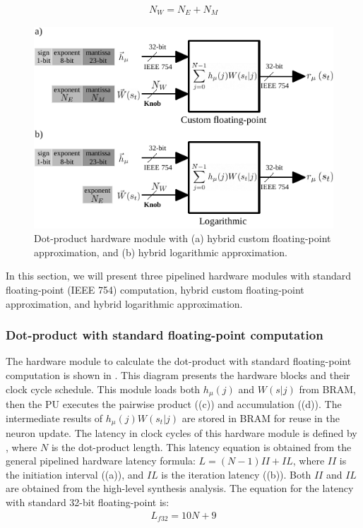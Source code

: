 \begin{eqnarray} \label{eq:bits_bitwidth}
N_W=N_E + N_M
\end{eqnarray}

\begin{figure}
\includegraphics[width=\columnwidth]{../figures/dot-product_unit_bitwidth.pdf}
\caption{Dot-product hardware module with (a) hybrid custom floating-point approximation, and (b) hybrid logarithmic approximation.}
\label{fig:product_unit_bitwidth}
\end{figure}

In this section, we will present three pipelined hardware modules with standard floating-point (IEEE 754) computation, hybrid custom floating-point approximation, and hybrid logarithmic approximation.

\subsubsection{Dot-product with standard floating-point computation}
 The hardware module to calculate the dot-product with standard floating-point computation is shown in . This diagram presents the hardware blocks and their clock cycle schedule. This module loads both $h_\mu(j)$ and $W(s|j)$ from BRAM, then the PU executes the pairwise product ((c)) and accumulation ((d)). The intermediate results of $h_\mu(j) W(s_t|j)$ are stored in BRAM for reuse in the neuron update. The latency in clock cycles of this hardware module is defined by , where $N$ is the dot-product length. This latency equation is obtained from the general pipelined hardware latency formula: $L=\left(N-1\right)II+IL$, where $II$ is the initiation interval ((a)), and $IL$ is the iteration latency ((b)). Both $II$ and $IL$ are obtained from the high-level synthesis analysis. The equation for the latency with standard 32-bit floating-point is:
 \begin{eqnarray} \label{eq:dot_standard_float_latency}
 L_{f32}=10N+9
 \end{eqnarray}
 
